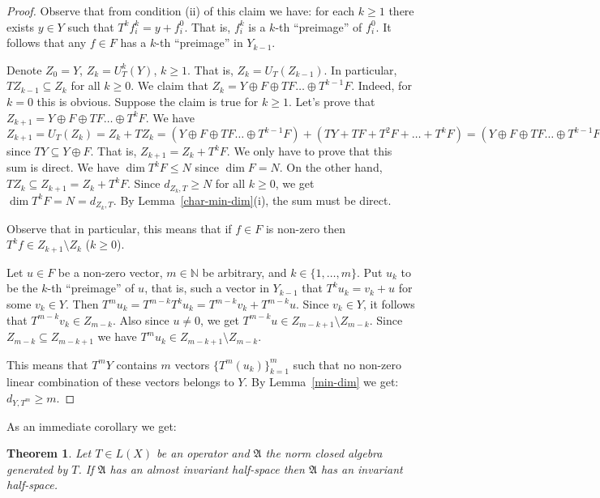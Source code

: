 \documentclass[12pt]{amsart}
\theoremstyle{plain}
\newtheorem{theorem}{Theorem}[section]
\theoremstyle{definition}
\theoremstyle{remark}
\begin{document}
\begin{proof}
Observe that from condition (ii) of this claim we have: for each $k{\geqslant} 1$ there exists $y\in Y$ such that $T^kf_i^{k}=y+f_i^{0}$. That is, $f_i^{k}$ is a $k$-th ``preimage'' of $f_i^{0}$. It follows that any $f\in F$ has a $k$-th ``preimage'' in $Y_{k-1}$.

Denote $Z_0=Y$, $Z_k=U_T^k(Y)$, $k{\geqslant} 1$. That is, $Z_k=U_T(Z_{k-1})$. In particular, $TZ_{k-1}\subseteq Z_k$ for all $k{\geqslant} 0$. We claim that $Z_k=Y\oplus F\oplus TF\dots\oplus T^{k-1}F$. Indeed, for $k=0$ this is obvious. Suppose the claim is true for $k{\geqslant} 1$. Let's prove that $Z_{k+1}=Y\oplus F\oplus TF\dots\oplus T^{k}F$. We have $Z_{k+1}=U_T(Z_k)=Z_k+TZ_k=(Y\oplus F\oplus TF\dots\oplus T^{k-1}F)+(TY+TF+T^2F+\dots+T^kF)=(Y\oplus F\oplus TF\dots\oplus T^{k-1}F)+T^kF$ since $TY\subseteq Y\oplus F$. That is, $Z_{k+1}=Z_k+T^kF$. We only have to prove that this sum is direct. We have $\dim T^kF{\leqslant} N$ since $\dim F=N$. On the other hand, $TZ_{k}\subseteq Z_{k+1}=Z_k+T^kF$. Since $d_{Z_k,T}{\geqslant} N$ for all $k{\geqslant} 0$, we get $\dim T^kF=N=d_{Z_k,T}$. By Lemma~\ref{char-min-dim}(i), the sum must be direct. 

Observe that in particular, this means that if $f\in F$ is non-zero then $T^kf\in Z_{k+1}\setminus Z_{k}$ ($k{\geqslant} 0$).

Let $u\in F$ be a non-zero vector, $m\in\mathbb N$ be arbitrary, and $k\in\{1,\dots,m\}$.  Put $u_k$ to be the $k$-th ``preimage'' of $u$, that is, such a vector in $Y_{k-1}$ that $T^ku_k=v_k+u$ for some $v_k\in Y$. Then $T^mu_k=T^{m-k}T^ku_k=T^{m-k}v_k+T^{m-k}u$. Since $v_k\in Y$, it follows that $T^{m-k}v_k\in Z_{m-k}$. Also since $u\ne 0$, we get $T^{m-k}u\in Z_{m-k+1}\setminus Z_{m-k}$. Since $Z_{m-k}\subseteq Z_{m-k+1}$ we have $T^mu_k\in Z_{m-k+1}\setminus Z_{m-k}$.
 
 This means that $T^mY$ contains $m$ vectors $\{T^m(u_k)\}_{k=1}^m$ such that 
 no non-zero linear combination of these vectors belongs to $Y$. By 
 Lemma~\ref{min-dim} we get: $d_{Y,T^m}{\geqslant} m$.
\end{proof}

As an immediate corollary we get:

\begin{theorem}\label{inv-existence}
Let $T\in L(X)$ be an operator and $\mathfrak A$ the norm closed algebra generated by $T$. If $\mathfrak A$ has an almost invariant half-space then $\mathfrak A$ has an invariant half-space.
\end{theorem}
\end{document}
